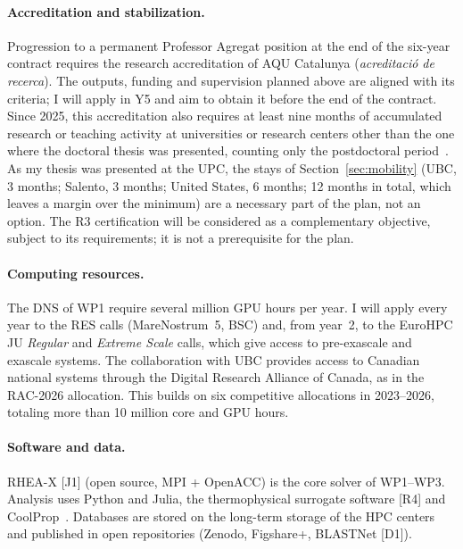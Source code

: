 \documentclass[11pt]{article}
\begin{document}
\paragraph{Accreditation and stabilization.} Progression to a permanent Professor Agregat
position at the end of the six-year contract requires the research accreditation of AQU
Catalunya (\emph{acreditaci\'o de recerca}). The outputs, funding and supervision planned
above are aligned with its criteria; I will apply in Y5 and aim to obtain it before the end
of the contract. Since 2025, this accreditation also requires at least nine months of
accumulated research or teaching activity at universities or research centers other than the
one where the doctoral thesis was presented, counting only the postdoctoral
period~\cite{AQU2025}. As my thesis was presented at the UPC, the stays of
Section~\ref{sec:mobility} (UBC, 3 months; Salento, 3 months; United States, 6 months;
12 months in total, which leaves a margin over the minimum) are a necessary part of the plan, not an option. The R3 certification will be considered as a complementary objective, subject
to its requirements; it is not a prerequisite for the plan.

\paragraph{Computing resources.} The DNS of WP1 require several million GPU hours per year. I will apply every year to the RES calls (MareNostrum~5, BSC) and, from year~2, to
the EuroHPC JU \emph{Regular} and \emph{Extreme Scale} calls, which give access to
pre-exascale and exascale systems. The collaboration with UBC provides access to Canadian
national systems through the Digital Research Alliance of Canada, as in the RAC-2026
allocation. This builds on six competitive allocations in 2023--2026, totaling more than 10
million core and GPU hours.

\paragraph{Software and data.} RHEA-X [J1] (open source, MPI + OpenACC) is the core solver of
WP1--WP3. Analysis uses Python and Julia, the thermophysical surrogate software [R4] and
CoolProp~\cite{CoolProp2014}. Databases are stored on the long-term storage of the HPC centers
and published in open repositories (Zenodo, Figshare+, BLASTNet [D1]).
\end{document}
